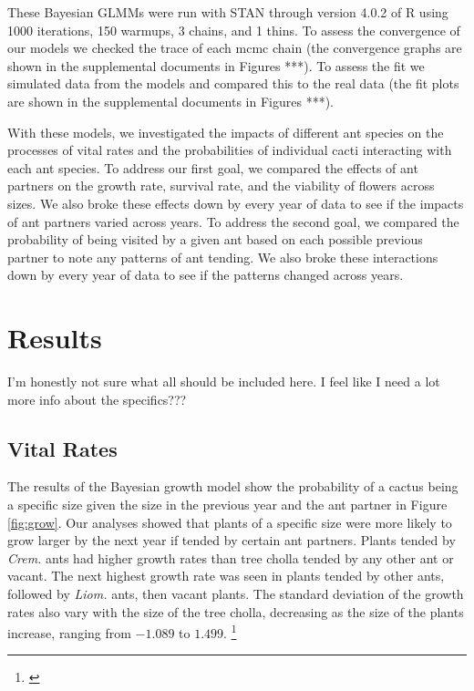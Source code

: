 \documentclass[12pt,a4paper]{article}
\newcommand{\ali}[2]{{\color{blue}{#1}}\footnote{\textit{\color{blue}{#2}}}}
\begin{document}
		These Bayesian GLMMs were run with STAN through version 4.0.2  of R using 1000 iterations, 150 warmups, 3 chains, and 1 thins. 
		To assess the convergence of our models we checked the trace of each mcmc chain (the convergence graphs are shown in the supplemental documents in Figures ***).
		To assess the fit we simulated data from the models and compared this to the real data (the fit plots are shown in the supplemental documents in Figures ***).
		
		With these models, we investigated the impacts of different ant species on the processes of vital rates and the probabilities of individual cacti interacting with each ant species.
		To address our first goal, we compared the effects of ant partners on the growth rate, survival rate, and the viability of flowers across sizes. 
		We also broke these effects down by every year of data to see if the impacts of ant partners varied across years. 
		To address the second goal, we compared the probability of being visited by a given ant based on each possible previous partner to note any patterns of ant tending. 
		We also broke these interactions down by every year of data to see if the patterns changed across years. 
		
		\vspace{1cm}
		
		
		\section*{Results}
		I’m honestly not sure what all should be included here. I feel like I need a lot more info about the specifics???
		
		\subsection*{Vital Rates}
		The results of the Bayesian growth model show the probability of a cactus being a specific size given the size in the previous year and the ant partner in Figure \ref{fig:grow}.
		Our analyses showed that plants of a specific size were more likely to grow larger by the next year if tended by certain ant partners. 
		Plants tended by \textit{Crem.} ants had higher growth rates than tree cholla tended by any other ant or vacant. 
		The next highest growth rate was seen in plants tended by other ants, followed by \textit{Liom.} ants, then vacant plants. 
		The standard deviation of the growth rates also vary with the size of the tree cholla, decreasing as the size of the plants increase, ranging from $-1.089$ to $1.499$.
		\ali{ }{I’m really unsure about what else I should say about this. }
		
\end{document}
